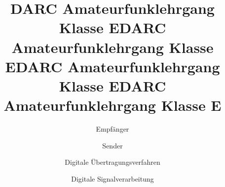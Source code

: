 \documentclass[aspectratio = 169]{beamer}
\begin{document}
\title{DARC Amateurfunklehrgang Klasse E}
\author{Empfänger}
\begin{frame}
\maketitle
\end{frame}










\title{DARC Amateurfunklehrgang Klasse E}
\author{Sender}
\begin{frame}
\maketitle
\end{frame}





\title{DARC Amateurfunklehrgang Klasse E}
\author{Digitale Übertragungsverfahren}
\begin{frame}
\maketitle
\end{frame}











\title{DARC Amateurfunklehrgang Klasse E}
\author{Digitale Signalverarbeitung}
\begin{frame}
\maketitle
\end{frame}

\end{document}
